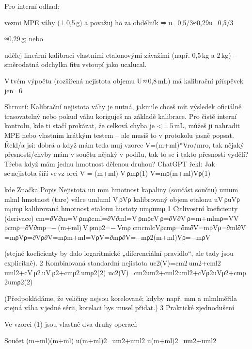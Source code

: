 {    Pro interní odhad:

        vezmi MPE váhy (± 0,5 g) a považuj ho za obdélník ⇒ u=0,5/3≈0,29u=0,5/3

        ​≈0,29 g; nebo

        udělej lineární kalibraci vlastními etalonovými závažími (např. 0,5 kg a 2 kg) – směrodatná odchylka fitu vstoupí jako ucalucal​.

V tvém výpočtu (rozšířená nejistota objemu U ≈ 0,8 mL) má kalibrační příspěvek jen ~6 %

Shrnutí:
Kalibrační nejistota váhy je nutná, jakmile chceš mít výsledek oficiálně trasovatelný nebo pokud váhu koriguješ na základě kalibrace. Pro čistě interní kontrolu, kde ti stačí prokázat, že celková chyba je < ± 5 mL, můžeš ji nahradit MPE nebo vlastním krátkým testem – ale musíš to v protokolu jasně popsat.
Řekl/a jsi:
dobrá a když mám teda muj vzorec V=(m+ml)*Vro/mro, tak nějaký přesnosti/chyby mám v součtu nějaký v podílu, tak to se i takto přesnosti vydělí? Třeba když mám jednu hmotnost dělenou druhou?
ChatGPT řekl:
Jak se nejistota šíří ve vz‑orci
V  =  (m+ml)  V ⁣ρmρ(1)
V=mρ​(m+ml​)Vρ​​(1)

kde
Značka	Popis	Nejistota uu
mm	hmotnost kapaliny (součást součtu)	umum​
mlml​	hmotnost (tare) válce	umluml​​
V ⁣ρVρ​	kalibrovaný objem etalonu	uV ⁣ρuVρ​​
mρmρ​	kalibrovaná hmotnost etalonu hustoty	umρumρ​​
1  Citlivostní koeficienty (derivace)
cm=∂V∂m=V ⁣ρmρcml=∂V∂ml=V ⁣ρmρcV ⁣ρ=∂V∂V ⁣ρ=m+mlmρ=VV ⁣ρcmρ=∂V∂mρ=− (m+ml) V ⁣ρmρ2=− Vmρ
cm​cml​​cVρ​​cmρ​​​=∂m∂V​=mρ​Vρ​​=∂ml​∂V​=mρ​Vρ​​=∂Vρ​∂V​=mρ​m+ml​​=Vρ​V​=∂mρ​∂V​=−mρ2​(m+ml​)Vρ​​=−mρ​V​​

(stejné koeficienty by dalo logaritmické „diferenciální pravidlo“, ale tady jsou explicitně).
2  Kombinovaná standardní nejistota
uc2(V)=cm2 um2+cml2 uml2+cV ⁣ρ2 uV ⁣ρ2+cmρ2 umρ2(2)
uc2​(V)=cm2​um2​+cml​2​uml​2​+cVρ​2​uVρ​2​+cmρ​2​umρ​2​​(2)

(Předpokládáme, že veličiny nejsou korelované; kdyby např. mm a mlml​ měřila stejná váha v jedné sérii, korelaci bys musel přidat.)
3  Praktické zjednodušení

Ve vzorci (1) jsou vlastně dva druhy operací:

    Součet (m+ml)(m+ml​)
    u(m+ml)2=um2+uml2
    u(m+ml​)2​=um2​+uml​2​

}
